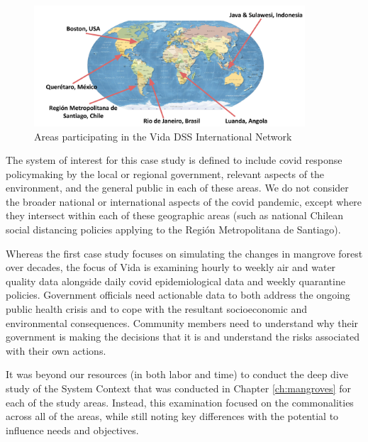 \begin{figure}[!htb]
	\centering
	\includegraphics[width=0.9\textwidth]{Figures/chap5/vida_map.png}
	\caption{Areas participating in the Vida DSS International Network}
	\label{fig:vida_map}
\end{figure}

The system of interest for this case study is defined to include \ac{covid} response policymaking by the local or regional government, relevant aspects of the environment, and the general public in each of these areas. We do not consider the broader national or international aspects of the \ac{covid} pandemic, except where they intersect within each of these geographic areas (such as national Chilean social distancing policies applying to the Región Metropolitana de Santiago). 

Whereas the first case study focuses on simulating the changes in mangrove forest over decades, the focus of Vida is examining hourly to weekly air and water quality data alongside daily \ac{covid} epidemiological data and weekly quarantine policies. Government officials need actionable data to both address the ongoing public health crisis and to cope with the resultant socioeconomic and environmental consequences. Community members need to understand why their government is making the decisions that it is and understand the risks associated with their own actions.

It was beyond our resources (in both labor and time) to conduct the deep dive study of the System Context that was conducted in Chapter \ref{ch:mangroves} for each of the study areas. Instead, this examination focused on the commonalities across all of the areas, while still noting key differences with the potential to influence needs and objectives. 



